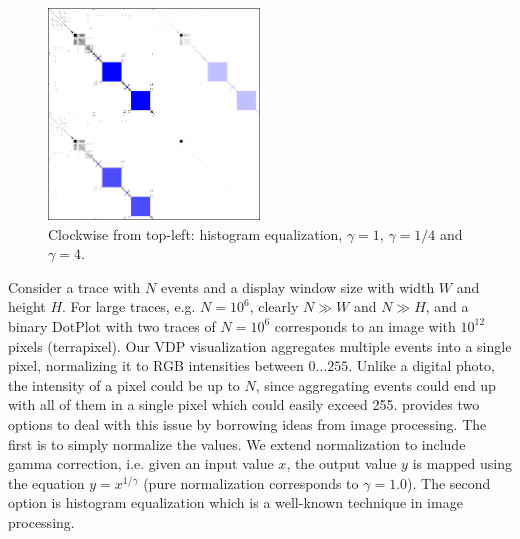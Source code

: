 \begin{figure}[tb]
\begin{center}
\includegraphics[width=0.5\textwidth]{lviz/gamma.png}
\caption{Clockwise from top-left:
histogram equalization, $\gamma=1$,
$\gamma=1/4$ and $\gamma=4$.
}
\label{fig:gamma}
\end{center}
\end{figure}

Consider a trace with $N$ events and
a display window size with width $W$ and height $H$.
For large traces, e.g. $N=10^6$, clearly $N \gg W$ and $N \gg H$,
and a binary DotPlot with two traces of $N=10^6$ corresponds to an
image with $10^{12}$ pixels (terrapixel).
Our VDP visualization aggregates multiple events into a single pixel,
normalizing it to RGB intensities between $0\ldots255$.
Unlike a digital photo, the intensity of a pixel could be up to $N$,
since aggregating events could end up with all of them
in a single pixel which could easily exceed 255.
 provides two options to deal with this issue by borrowing 
ideas from image processing.
The first is to simply normalize the values.
We extend normalization to include gamma correction, i.e. given an input value $x$,
the output value $y$ is mapped using the equation $y=x^{1/\gamma}$
(pure normalization corresponds to $\gamma = 1.0$).
The second option is histogram equalization which is
a well-known technique in image processing.


